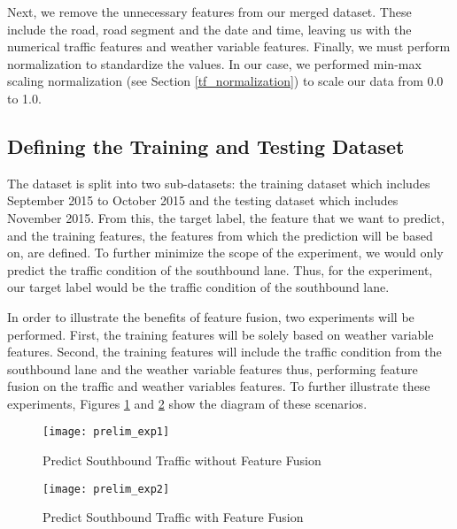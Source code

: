 Next, we remove the unnecessary features from our merged dataset. These include the road, road segment and the date and time, leaving us with the numerical traffic features and weather variable features. Finally, we must perform normalization to standardize the values. In our case, we performed min-max scaling normalization (see Section \ref{tf_normalization}) to scale our data from 0.0 to 1.0.



\subsection{Defining the Training and Testing Dataset}
The dataset is split into two sub-datasets: the training dataset which includes September 2015 to October 2015 and the testing dataset which includes November 2015. From this, the target label, the feature that we want to predict, and the training features, the features from which the prediction will be based on, are defined. To further minimize the scope of the experiment, we would only predict the traffic condition of the southbound lane. Thus, for the experiment, our target label would be the traffic condition of the southbound lane.

In order to illustrate the benefits of feature fusion, two experiments will be performed. First, the training features will be solely based on weather variable features. Second, the training features will include the traffic condition from the southbound lane and the weather variable features thus, performing feature fusion on the traffic and weather variables features. To further illustrate these experiments, Figures \ref{figure:prelim_exp1} and \ref{figure:prelim_exp2} show the diagram of these scenarios.




\begin{figure}[h]
\caption{Predict Southbound Traffic without Feature Fusion}
\centering
\texttt{[image: prelim\_exp1]}
\label{figure:prelim_exp1}
\end{figure}

\begin{figure}[h]
\caption{Predict Southbound Traffic with Feature Fusion}
\centering
\texttt{[image: prelim\_exp2]}
\label{figure:prelim_exp2}
\end{figure}

